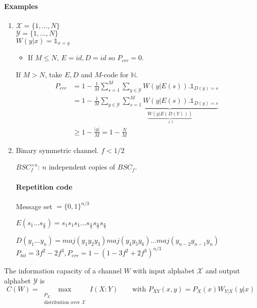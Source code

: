 \paragraph{Examples}
\begin{enumerate}
\item $\mathcal{X}=\{1,...,N\}$\\
$\mathcal{Y}=\{1,...,N\}$\\
$W(y|x)=\mathbb{1}_{x=y}$
\begin{itemize}
\item If $M\leq N$, $E=id, D=id$ so $P_{err}=0$.
\end{itemize} If $M>N$, take $E, D$ and $M$-code for $\mathbb{N}.$
\begin{align*}
P_{err} & = 1 - \frac{1}{M}\sum_{s=1}^M \sum_{y\in \mathcal{Y}} W(y|E(s)).\mathbb{1}_{D(y)=s}\\
& = 1 - \frac{1}{M}\sum_{y\in \mathcal{Y}} \underbrace{\sum_{s=1}^M W(y|E(s)).\mathbb{1}_{D(y)=s}}_{\underbrace{W(y|E(D(Y)))}_{\leq 1}}\\
& \geq 1 - \frac{|y|}{M}=1-\frac{N}{M}
\end{align*}

\item Binary symmetric channel.
$f<1/2$

$BSC_f^{\times n}$: $n$ independent copies of $BSC_f$.

\paragraph{Repetition code}
Message set $=\{0,1\}^{n/3}$

 $E(s_1...s_{\frac{n}{3}})=s_1s_1s_1...s_{\frac{n}{3}}s_{\frac{n}{3}}s_{\frac{n}{3}}$

 $D(y_1...y_n)=maj(y_1y_2y_3)maj(y_4y_5y_6) ... maj(y_{n-2}y_{n-1}y_{n})$\\
$P_{bit}=3f^2-2f^3, P_{err}=1-(1-3f^2+2f^3)^{n/3}$
\end{enumerate}

\begin{defi}
The information capacity of a channel $W$ with input alphabet $\mathcal{X}$ and output alphabet $\mathcal{Y}$ is
\[ C(W)=\max\limits_{\substack{P_X \\ \text{distribution over $\mathcal{X}$}}} I(X:Y) \qquad \text{with } P_{XY}(x,y)=P_X(x)W_{Y|X}(y|x)\]
\end{defi}

